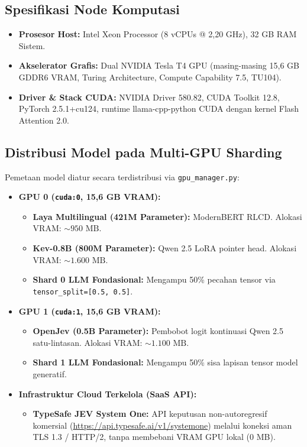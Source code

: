 \documentclass[journal,compsoc]{IEEEtran}
\begin{document}
\subsection{Spesifikasi Node Komputasi}
\begin{itemize}
    \item \textbf{Prosesor Host:} Intel Xeon Processor (8 vCPUs @ 2,20 GHz), 32 GB RAM Sistem.
    \item \textbf{Akselerator Grafis:} Dual NVIDIA Tesla T4 GPU (masing-masing 15,6 GB GDDR6 VRAM, Turing Architecture, Compute Capability 7.5, TU104).
    \item \textbf{Driver \& Stack CUDA:} NVIDIA Driver 580.82, CUDA Toolkit 12.8, PyTorch 2.5.1+cu124, runtime llama-cpp-python CUDA dengan kernel Flash Attention 2.0.
\end{itemize}

\subsection{Distribusi Model pada Multi-GPU Sharding}
Pemetaan model diatur secara terdistribusi via \texttt{gpu\_manager.py}:
\begin{itemize}
    \item \textbf{GPU 0 (\texttt{cuda:0}, 15,6 GB VRAM):}
    \begin{itemize}
        \item \textbf{Laya Multilingual (421M Parameter):} ModernBERT RLCD. Alokasi VRAM: $\sim 950 \text{ MB}$.
        \item \textbf{Kev-0.8B (800M Parameter):} Qwen 2.5 LoRA pointer head. Alokasi VRAM: $\sim 1.600 \text{ MB}$.
        \item \textbf{Shard 0 LLM Fondasional:} Mengampu 50\% pecahan tensor via \texttt{tensor\_split=[0.5, 0.5]}.
    \end{itemize}
    \item \textbf{GPU 1 (\texttt{cuda:1}, 15,6 GB VRAM):}
    \begin{itemize}
        \item \textbf{OpenJev (0.5B Parameter):} Pembobot logit kontinuasi Qwen 2.5 satu-lintasan. Alokasi VRAM: $\sim 1.100 \text{ MB}$.
        \item \textbf{Shard 1 LLM Fondasional:} Mengampu 50\% sisa lapisan tensor model generatif.
    \end{itemize}
    \item \textbf{Infrastruktur Cloud Terkelola (SaaS API):}
    \begin{itemize}
        \item \textbf{TypeSafe JEV System One:} API keputusan non-autoregresif komersial (\url{https://api.typesafe.ai/v1/systemone}) melalui koneksi aman TLS 1.3 / HTTP/2, tanpa membebani VRAM GPU lokal (0 MB).
    \end{itemize}
\end{itemize}
\end{document}

